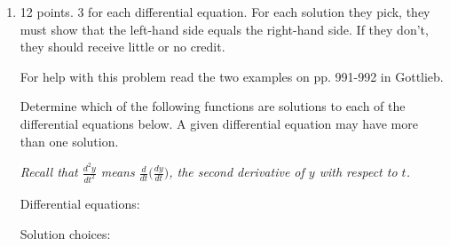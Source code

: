 \documentclass{article}
\begin{document}
\begin{enumerate}
\pspace{\vfill\newpage}

\item 

\begin{grading}
    12 points. 3 for each differential equation. For each solution they pick, they must
show that the left-hand side equals the right-hand side. If they don’t, they should receive little or no
credit.
\end{grading}


  \begin{problem}
    For help with this problem read the two examples on
    pp. 991-992 in Gottlieb.

    Determine which of the following functions are solutions to each of
    the differential equations below. A given differential equation may
    have more than one solution.
    
    \emph{Recall that $\displaystyle \frac{d^2 y}{dt^2}$ means $\displaystyle \frac{d}{dt}\bigg(\frac{dy}{dt}\bigg)$, the second derivative of $y$ with respect to $t$.}
  \end{problem}

      Differential equations:
    
      \begin{enumerate}
      \end{enumerate}
  
    Solution choices:    
      \begin{enumerate}[label=\roman*., ref=\roman*]
\end{enumerate}


\end{enumerate}
\end{document}
